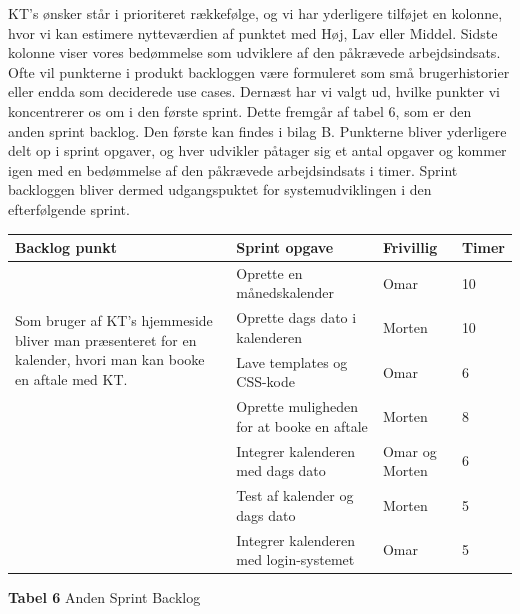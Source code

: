 \documentclass[12pt]{article}   %
\begin{document}
KT's ønsker står i prioriteret rækkefølge, og vi har yderligere tilføjet en kolonne, hvor vi kan estimere nytteværdien af punktet med Høj, Lav eller
Middel. Sidste kolonne viser vores bedømmelse som udviklere af den påkrævede arbejdsindsats. Ofte vil punkterne i produkt backloggen være formuleret som små brugerhistorier eller endda som deciderede use cases. Dernæst har vi valgt ud, hvilke punkter vi koncentrerer os om i den første sprint. Dette fremgår af tabel 6, som er den anden sprint backlog. Den første kan findes i bilag B. Punkterne bliver yderligere delt op i sprint opgaver, og hver udvikler påtager sig et antal opgaver og kommer igen med en bedømmelse af den påkrævede arbejdsindsats i timer. Sprint backloggen bliver dermed udgangspuktet for systemudviklingen i den efterfølgende sprint. 


\begin{center}
	\begin{tabular}{|l|p{4cm}|l|l|}
		\hline
		Backlog punkt & Sprint opgave & Frivillig & Timer\\ \hline
		\multirow{4}{4cm}{Som bruger af KT's hjemmeside bliver man præsenteret for en kalender, hvori man
		kan booke en aftale med KT.} & Oprette en månedskalender & Omar  & 10 \\
		& Oprette dags dato i kalenderen & Morten & 10 \\
		& Lave templates og CSS-kode & Omar & 6 \\
		& Oprette muligheden for at booke en aftale & Morten
		& 8 \\ 
		& Integrer kalenderen med dags dato & Omar og Morten & 6 \\
		& Test af kalender og dags dato & Morten & 5
		\\ & Integrer kalenderen med login-systemet & Omar & 5 \\
		\hline

	\end{tabular}
\end{center}

\begin{center}
\textbf{Tabel 6} Anden Sprint Backlog
\end{center}

\vspace{0.5cm}
\end{document}
